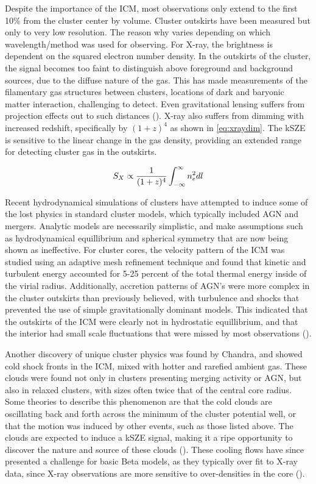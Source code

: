 \documentclass[manuscript]{aastex}
\begin{document}
Despite the importance of the ICM, most observations only extend to the first 10\% from the cluster center by volume. Cluster outskirts have been measured but only to very low resolution. The reason why varies depending on which wavelength/method was used for observing. For X-ray, the brightness is dependent on the squared electron number density. In the outskirts of the cluster, the signal becomes too faint to distinguish above foreground and background sources, due to the diffuse nature of the gas.  This has made measurements of the filamentary gas structures between clusters, locations of dark and baryonic matter interaction, challenging to detect. Even gravitational lensing suffers from projection effects out to such distances (\cite{Reiprich2013}). X-ray also suffers from dimming with increased redshift, specifically by \((1+z)^{4}\) as shown in \ref{eq:xraydim}. The kSZE is sensitive to the linear change in the gas density, providing an extended range for detecting cluster gas in the outskirts. 

\begin{equation}\label{eq:xraydim}
S_{X} \propto \frac{1}{(1+z)^4} \Large\int^{\infty}_{-\infty}  n_{e}^{2} dl
\end{equation}

Recent hydrodynamical simulations of clusters have attempted to induce some of the lost physics in standard cluster models, which typically included AGN and mergers. Analytic models are necessarily simplistic,  and make assumptions such as hydrodynamical equillibrium and spherical symmetry that are now being shown as ineffective. For cluster cores, the velocity pattern of the ICM was studied using an adaptive mesh refinement technique and found that kinetic and turbulent energy accounted for 5-25 percent of the total thermal energy inside of the virial radius. Additionally, accretion patterns of AGN's were more complex in the cluster outskirts than previously believed, with turbulence and shocks that prevented the use of simple gravitationally dominant models. This indicated that the outskirts of the ICM were clearly not in hydrostatic equillibrium, and that the interior had small scale fluctuations that were missed by most observations (\cite{Reiprich2013}).  

Another discovery of unique cluster physics was found by Chandra, and showed cold shock fronts in the ICM, mixed with hotter and rarefied ambient gas. These clouds were found not only in clusters presenting merging activity or AGN, but also in relaxed clusters, with sizes often twice that of the central core radius. Some theories to describe this phenomenon are that the cold clouds are oscillating back and forth across the minimum of the cluster potential well, or that the motion was induced by other events, such as those listed above. The clouds are expected to induce a kSZE signal, making it a ripe opportunity to discover the nature and source of these clouds (\cite{Diego2003}). These cooling flows have since presented a challenge for basic Beta models, as they typically over fit to X-ray data, since X-ray observations are more sensitive to over-densities in the core (\cite{Benson2003}). 
\end{document}
